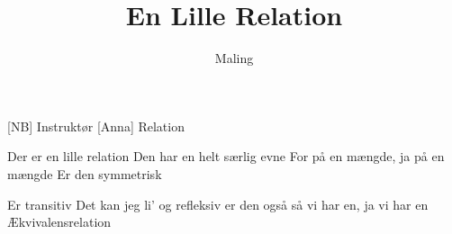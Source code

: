 \documentclass[a4paper,11pt]{article}
\title{En Lille Relation}
\author{Maling}
\begin{document}
\maketitle

\begin{roles}
[NB] Instruktør
[Anna] Relation
\end{roles}

\begin{song}

 Der er en lille relation
Den har en helt særlig evne
For på en mængde, ja på en mængde
Er den symmetrisk

 Er transitiv
Det kan jeg li’ og refleksiv er den også 
så vi har en, ja vi har en
Ækvivalensrelation

\end{song}
\end{document}
